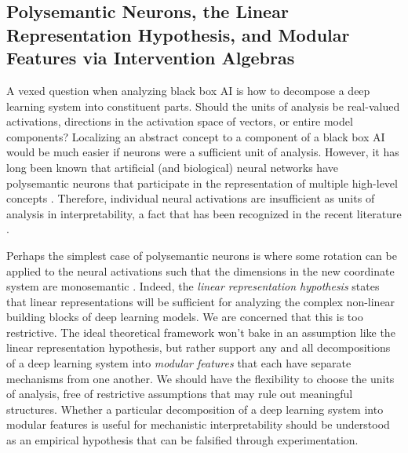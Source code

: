 \documentclass[twoside,11pt]{article}
\begin{document}
\subsection{Polysemantic Neurons, the Linear Representation Hypothesis, and Modular Features via Intervention Algebras}
A vexed question when analyzing black box AI is how to decompose a deep learning system into constituent parts. Should the units of analysis be real-valued activations, directions in the activation space of vectors, or entire model components?  Localizing an abstract concept to a component of a black box AI would be much easier if neurons were a sufficient unit of analysis. However, it has long been known that artificial (and biological) neural networks have polysemantic neurons that participate in the representation of multiple high-level concepts \citep{Smolensky1988a, PDP1, PDP2, Thorpe89}. Therefore, individual neural activations are insufficient as units of analysis in interpretability, a fact that has been recognized in the recent literature %
\citep{Harradon:2018,cammarata2020thread,olah2020zoom, goh2021multimodal, elhage2021mathematical,bolukbasi:2021, Geiger-etal:2023:DAS,Gurnee:2023,huang-etal-2023-rigorously}.

Perhaps the simplest case of polysemantic neurons is  where some rotation can be applied to the neural activations such that the dimensions in the new coordinate system are monosemantic \citep{Smolensky1988a, elhage2021mathematical,Scherlis:2022,Geiger-etal:2023:DAS}. Indeed, the \textit{linear representation hypothesis} \citep{mikolov-etal-2013-linguistic,elhage2022superposition,Nanda2023, Park:2023, Jiang:2024} states that linear representations will be sufficient for analyzing the complex non-linear building blocks of deep learning models. We are concerned that this is too restrictive. The ideal theoretical framework won't bake in an assumption like the linear representation hypothesis, but rather support any and all decompositions of a deep learning system into \textit{modular features} that each have separate mechanisms from one another. We should have the flexibility to choose the units of analysis, free of restrictive assumptions that may rule out meaningful structures. Whether a particular decomposition of a deep learning system into modular features is useful for mechanistic interpretability should be understood as an empirical hypothesis that can be falsified through experimentation.
\end{document}
